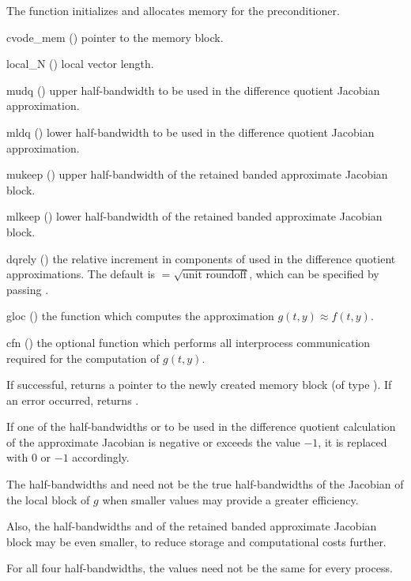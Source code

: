 {
  The function  initializes and allocates
  memory for the {\cvbbdpre} preconditioner.
}
{
  \begin{args}
  \item[cvode\_mem] ()
    pointer to the {\cvodes} memory block.
  \item[local\_N] ()
    local vector length.
  \item[mudq] ()
    upper half-bandwidth to be used in the difference quotient Jacobian approximation.
  \item[mldq] ()
    lower half-bandwidth to be used in the difference quotient Jacobian approximation.
  \item[mukeep] ()
    upper half-bandwidth of the retained banded approximate Jacobian block.
  \item[mlkeep] ()
    lower half-bandwidth of the retained banded approximate Jacobian block.
  \item[dqrely] ()
    the relative increment in components of  used in the difference quotient
    approximations.  The default is $ = \sqrt{\text{unit roundoff}}$,
    which can be specified by passing .
  \item[gloc] ()
    the {\C} function which computes the approximation $g(t,y) \approx f(t,y)$. 
  \item[cfn] ()
    the optional {\C} function which performs all interprocess communication
    required for the computation of $g(t,y)$.
  \end{args}
}
{
  If successful,  returns a pointer to the newly created 
  {\cvbbdpre} memory block (of type ).
  If an error occurred,  returns .
}
{
  If one of the half-bandwidths  or  to be used in the 
  difference quotient calculation of the approximate Jacobian is negative or 
  exceeds the value $-1$, it is replaced with 0 or
  $-1$ accordingly.

  The half-bandwidths  and  need not be the true 
  half-bandwidths of the Jacobian of the local block of $g$    
  when smaller values may provide a greater efficiency.       

  Also, the half-bandwidths  and  of the retained 
  banded approximate Jacobian block may be even smaller,      
  to reduce storage and computational costs further.            

  For all four half-bandwidths, the values need not be the    
  same for every process.
}
